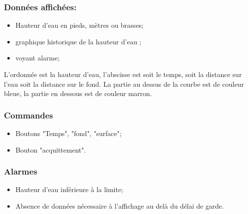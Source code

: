 \documentclass[a4paper,11pt]{report}
\begin{document}
\subsubsection{Données affichées:}
\begin{itemize}
	\item Hauteur d'eau en pieds, mètres ou brasses; 
	\item graphique historique de la hauteur d'eau ;
	\item voyant alarme;
\end{itemize}
L'ordonnée est la hauteur d'eau, l'abscisse est soit le temps, soit la distance sur l'eau
soit la distance sur le fond. La partie au dessus de la courbe est de couleur bleue,
la partie en dessous est de couleur marron.

\subsubsection{Commandes}
\begin{itemize}
	\item Boutons "Temps", "fond", "surface";
	\item Bouton "acquittement".
\end{itemize}

\subsubsection{Alarmes}
\begin{itemize}
	\item Hauteur d'eau inférieure à la limite;
	\item Absence de données nécessaire à l'affichage
	au delà du délai de garde.
\end{itemize}
\end{document}
